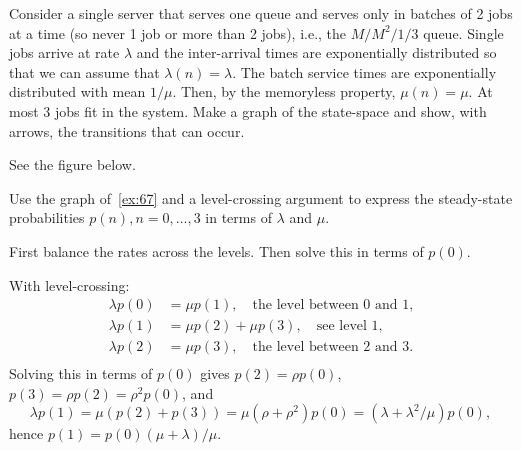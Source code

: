 \begin{exercise}
Consider a single server that serves one queue and serves only in batches of 2 jobs at a time (so never 1 job or more than 2 jobs), i.e., the $M/M^2/1/3$ queue.
 Single jobs arrive at rate $\lambda$ and the inter-arrival times are exponentially distributed so that we can assume that $\lambda(n) = \lambda$.
 The batch service times are exponentially distributed with mean $1/\mu$.
 Then, by the memoryless property, $\mu(n) = \mu$.
 At most 3 jobs fit in the system.
 Make a graph of the state-space and show, with arrows, the transitions that can occur.

\begin{solution}
See the figure below.

\end{solution}
\end{exercise}

\begin{exercise}
 Use the graph of~\cref{ex:67} and a level-crossing argument to express the steady-state probabilities $p(n), n=0,\ldots, 3$ in terms of $\lambda$ and $\mu$.
\begin{hint}
First balance the rates across the levels. Then solve this in terms of $p(0)$.
\end{hint}
\begin{solution}
With level-crossing:
 \begin{align*}
 \lambda p(0) &= \mu p(1), \quad\text{the level between 0 and 1,}\\
 \lambda p(1) &= \mu p(2) +\mu p(3), \quad\text{see level 1,}\\
 \lambda p(2) &= \mu p(3), \quad\text{the level between 2 and 3.}\\
 \end{align*}
 Solving this in terms of $p(0)$ gives $p(2) = \rho p(0)$, $p(3) = \rho p(2) = \rho^2p(0)$, and
 \begin{equation*}
 \lambda p(1) = \mu(p(2) + p(3)) = \mu (\rho + \rho^2) p(0) = (\lambda + \lambda^2/\mu) p(0),
 \end{equation*}
hence $p(1) = p(0)(\mu + \lambda)/\mu$. 
\end{solution}
\end{exercise}



